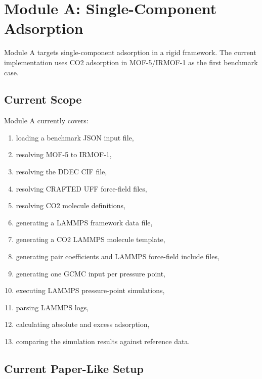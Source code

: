 \section{Module A: Single-Component Adsorption}

Module A targets single-component adsorption in a rigid framework.
The current implementation uses CO2 adsorption in MOF-5/IRMOF-1 as the first benchmark case.

\subsection{Current Scope}

Module A currently covers:

\begin{enumerate}
    \item loading a benchmark JSON input file,
    \item resolving MOF-5 to IRMOF-1,
    \item resolving the DDEC CIF file,
    \item resolving CRAFTED UFF force-field files,
    \item resolving CO2 molecule definitions,
    \item generating a LAMMPS framework data file,
    \item generating a CO2 LAMMPS molecule template,
    \item generating pair coefficients and LAMMPS force-field include files,
    \item generating one GCMC input per pressure point,
    \item executing LAMMPS pressure-point simulations,
    \item parsing LAMMPS logs,
    \item calculating absolute and excess adsorption,
    \item comparing the simulation results against reference data.
\end{enumerate}

\subsection{Current Paper-Like Setup}

